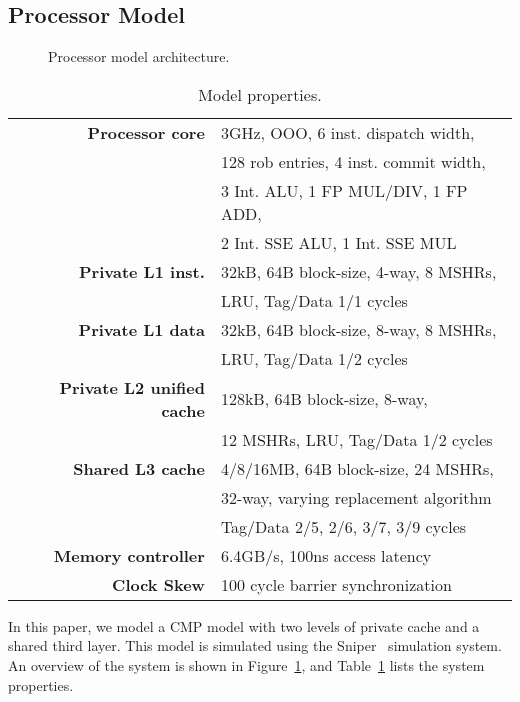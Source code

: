 
\subsection{Processor Model}
\begin{figure}[t]
\centering
\caption{Processor model architecture.}
\label{fig:processor_model}
\end{figure}


\begin{table}[ht]
\centering
\begin{tabular}{rl}
\toprule
\bf{Processor core}                 & 3GHz, OOO, 6 inst. dispatch width,     \\
                                    & 128 rob entries, 4 inst. commit width, \\
                                    & 3 Int. ALU, 1 FP MUL/DIV, 1 FP ADD, \\
                                    & 2 Int. SSE ALU, 1 Int. SSE MUL \\
\bf{Private L1 inst.}               & 32kB, 64B block-size, 4-way, 8 MSHRs, \\
									& LRU, Tag/Data 1/1 cycles \\
\bf{Private L1 data}                & 32kB, 64B block-size, 8-way, 8 MSHRs, \\
									& LRU, Tag/Data 1/2 cycles \\
\bf{Private L2 unified cache}       & 128kB, 64B block-size, 8-way, \\
                                    & 12 MSHRs, LRU, Tag/Data 1/2 cycles     \\
\bf{Shared L3 cache}                & 4/8/16MB, 64B block-size, 24 MSHRs, \\
                                    & 32-way, varying replacement algorithm \\
                                    & Tag/Data 2/5, 2/6, 3/7, 3/9 cycles         \\
\bf{Memory controller}              & 6.4GB/s, 100ns access latency         \\
\bf{Clock Skew}                     & 100 cycle barrier synchronization        \\
\bottomrule                             
\end{tabular}
\caption{Model properties.}
\label{tbl:processor_model:properties}
\end{table}

In this paper, we model a CMP model with two levels of private cache and a shared third layer.
This model is simulated using the Sniper~\cite{Carlson2011} simulation system.
An overview of the system is shown in Figure~\ref{fig:processor_model}, and Table~\ref{tbl:processor_model:properties} lists the system properties.

